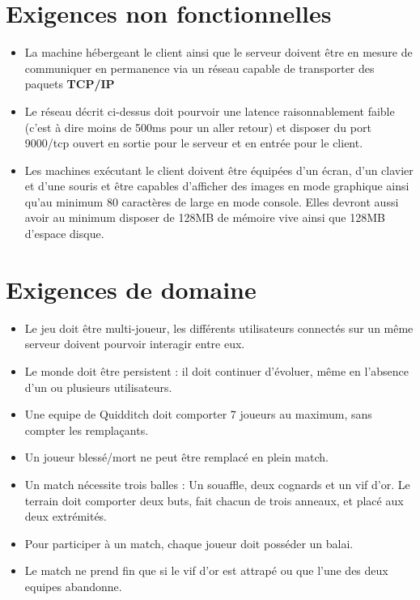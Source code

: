 \documentclass[a4paper]{report}
\begin{document}
\section{Exigences non fonctionnelles}
\begin{itemize}
    \item La machine hébergeant le \gls{client} ainsi que le \gls{serveur} doivent être en mesure de communiquer en permanence via un réseau capable de transporter des paquets \textbf{TCP/IP}
    \item Le réseau décrit ci-dessus doit pourvoir une latence raisonnablement faible (c'est à dire moins de 500ms pour un aller retour) et disposer du port 9000/tcp ouvert en sortie pour le serveur et en entrée pour le client.
    \item Les machines exécutant le \gls{client} doivent être équipées d'un écran, d'un clavier et d'une souris et être capables d'afficher des images en mode graphique ainsi qu'au minimum 80 caractères de large en mode console. Elles devront aussi avoir au minimum disposer de 128MB de mémoire vive ainsi que 128MB d'espace disque.
\end{itemize}


\section{Exigences de domaine}
\begin{itemize}
    \item Le jeu doit être multi-joueur, les différents \glspl{utilisateur} connectés sur un même \gls{serveur} doivent pourvoir interagir entre eux.
    \item Le monde doit être persistent : il doit continuer d'évoluer, même en l'absence d'un ou plusieurs \glspl{utilisateur}.
    \item Une \gls{equipe} de Quidditch doit comporter 7 \glspl{joueur} au maximum, sans compter les remplaçants.
    \item Un \gls{joueur} blessé/mort ne peut être remplacé en plein match.
    \item Un match nécessite trois balles : Un souaffle, deux cognards et un vif d'or. Le terrain doit comporter deux buts, fait chacun de trois anneaux, et placé aux deux extrémités.
    \item Pour participer à un match, chaque \gls{joueur} doit posséder un balai.
    \item Le match ne prend fin que si le vif d'or est attrapé ou que l'une des deux \glspl{equipe} abandonne.

\end{itemize}
\end{document}
